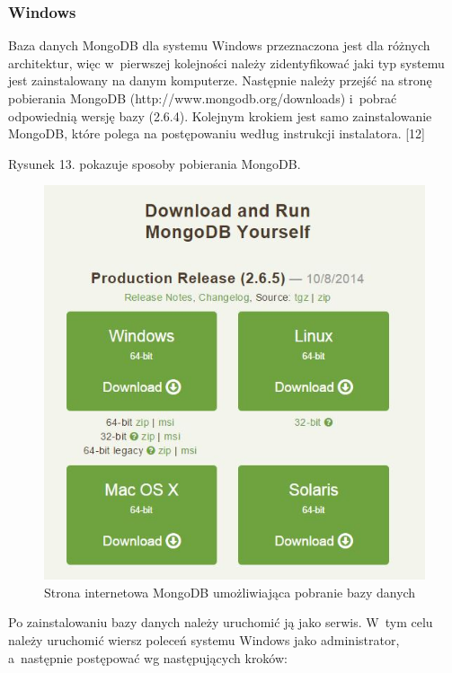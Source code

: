 \documentclass[12pt,a4paper,notitlepage]{article}
\begin{document}
\subsubsection{Windows}
Baza danych MongoDB dla systemu Windows przeznaczona jest dla różnych architektur, więc w~pierwszej kolejności należy zidentyfikować jaki typ systemu jest zainstalowany na danym komputerze. Następnie należy przejść na stronę pobierania MongoDB (http://www.mongodb.org/downloads) i~pobrać odpowiednią wersję bazy (2.6.4). Kolejnym krokiem jest samo zainstalowanie MongoDB, które polega na postępowaniu według instrukcji instalatora. [12]
\par Rysunek 13. pokazuje sposoby pobierania MongoDB.
\begin{figure}[H]
    \centering
    \includegraphics[width=\linewidth]{obrazy/mongoWdr}
    \caption{Strona internetowa MongoDB umożliwiająca pobranie bazy danych}
\end{figure} 
Po zainstalowaniu bazy danych należy uruchomić ją jako serwis. W~tym celu należy uruchomić wiersz poleceń systemu Windows jako administrator, a~następnie postępować wg następujących kroków: \\
\end{document}
